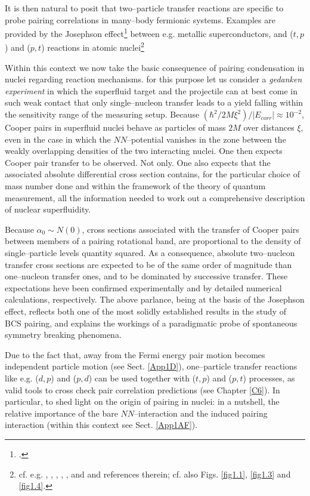 It is then natural to posit that two--particle transfer reactions are specific to probe pairing correlations in many--body fermionic systems. Examples are provided by the Josephson effect\footnote{\cite{Josephson:62}.} between e.g. metallic superconductors, and ($t,p$) and ($p,t$) reactions in atomic nuclei\footnote{cf. e.g. \cite{Yoshida:62}, \cite{Broglia:73}, \cite{Bayman:71}, \cite{Glendenning:65}, \cite{Bohr:64}, \cite{Hansen:12} and \cite{Potel:13} and references therein; cf. also Figs. \ref{fig1.1}, \ref{fig1.3} and \ref{fig1.4}.}

Within this context we now take the basic consequence of pairing condensation in nuclei regarding reaction mechanisms. for this purpose let us consider a \textit{gedanken experiment} in which the superfluid target and the projectile can at best come in such weak contact that only  single--nucleon transfer leads to a yield falling within the sensitivity range of the measuring setup. Because $\left(\hbar^2/2M\xi^2\right)/|E_{corr}|\approx10^{-2}$, Cooper pairs in superfluid nuclei behave as particles of mass $2M$
 over distances $\xi$, even in the case in which the $NN$--potential vanishes in the zone between the weakly overlapping densities of the two interacting nuclei. One then expects Cooper pair transfer to be observed. Not only. One also expects that the associated absolute differential cross section contains, for the particular choice of mass number done and within the framework of the theory of quantum measurement, all the information needed to work out a comprehensive description of nuclear superfluidity.
 
 Because $\alpha_0\sim N(0)$, cross sections associated with the transfer of Cooper pairs between members of a pairing rotational band, are proportional to the density of single--particle levels quantity squared. As a consequence, absolute two--nucleon transfer cross sections are expected to be of the same order of magnitude than one--nucleon transfer ones, and to be dominated by successive transfer. These expectations heve been confirmed experimentally and by detailed numerical calculations, respectively.
 The above parlance, being at the basis of the Josephson effect, reflects both one of the most solidly established results in the study of BCS pairing, and explains the workings of a paradigmatic probe of spontaneous symmetry breaking phenomena.
 
 
 
Due to the fact that, away from the Fermi energy pair  motion becomes independent particle motion (see Sect. \ref{App1D}), one--particle transfer reactions like e.g. ($d,p$) and ($p,d$) can be used together with ($t,p$) and ($p,t$) processes, as  valid tools to cross check pair correlation predictions (see Chapter \ref{C6}). In particular, to shed light on the origin of pairing in nuclei: in a nutshell, the relative importance of the bare $NN$--interaction and the induced pairing interaction (within this context see Sect. \ref{App1AF}).

